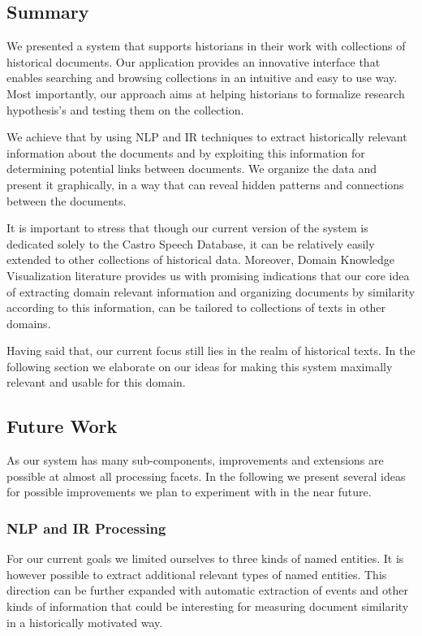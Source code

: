 \subsection {Summary}
\label{sec:summary}

We presented a system that supports historians in their work with collections of historical documents. 
Our application provides an innovative interface that enables searching and browsing collections in an intuitive and easy to use way.
Most importantly, our approach aims at helping historians to formalize research hypothesis's and testing them on the collection.

We achieve that by using NLP and IR techniques to extract historically relevant information about the documents and by exploiting
this information for determining potential links between documents. We organize the data and present it graphically,
in a way that can reveal hidden patterns and connections between the documents.
 
It is important to stress that though our current version of the system is dedicated solely to the Castro Speech Database, 
it can be relatively easily extended to other collections of historical data. Moreover, Domain Knowledge Visualization literature
provides us with promising indications that our core idea of extracting domain relevant information and organizing documents by similarity 
according to this information, can be tailored to collections of texts in other domains. 

Having said that, our current focus still lies in the realm of historical texts. In the following section we elaborate on
our ideas for making this system maximally relevant and usable for this domain. 
 

\subsection {Future Work}
\label{sec:future_work}
As our system has many sub-components, improvements and extensions are possible
at almost all processing facets. In the following we present several ideas for possible improvements we plan to experiment with in the
near future.

\subsubsection{NLP and IR Processing}
\label{sec:future_work_NLP}
For our current goals we limited ourselves to three kinds of named entities. 
It is however possible to extract additional relevant types of named entities. 
This direction can be further expanded with automatic extraction of events and other kinds of information that could be interesting for measuring 
document similarity in a historically motivated way.  

